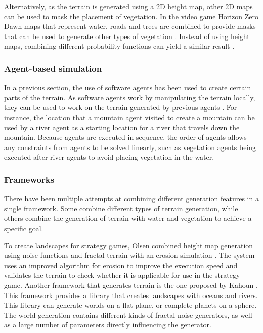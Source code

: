 \documentclass{article}
\begin{document}
Alternatively, as the terrain is generated using a 2D height map, other 2D maps can be used to mask the placement of vegetation. In the video game Horizon Zero Dawn maps that represent water, roads and trees are combined to provide masks that can be used to generate other types of vegetation \cite{van_muijden_gpu-based_2017}. Instead of using height maps, combining different probability functions can yield a similar result \cite{weier_generating_2013}.

\subsubsection{Agent-based simulation}
In a previous section, the use of software agents has been used to create certain parts of the terrain. As software agents work by manipulating the terrain locally, they can be used to work on the terrain generated by previous agents \cite{doran_controlled_2010}. For instance, the location that a mountain agent visited to create a mountain can be used by a river agent as a starting location for a river that travels down the mountain. Because agents are executed in sequence, the order of agents allows any constraints from agents to be solved linearly, such as vegetation agents being executed after river agents to avoid placing vegetation in the water.

\subsubsection{Frameworks}
There have been multiple attempts at combining different generation features in a single framework. Some combine different types of terrain generation, while others combine the generation of terrain with water and vegetation to achieve a specific goal.

To create landscapes for strategy games, Olsen combined height map generation using noise functions and fractal terrain with an erosion simulation \cite{olsen_realtime_2004}. The system uses an improved algorithm for erosion to improve the execution speed and validates the terrain to check whether it is applicable for use in the strategy game. Another framework that generates terrain is the one proposed by Kahoun \cite{kahoun_realtime_2013}. This framework provides a library that creates landscapes with oceans and rivers. This library can generate worlds on a flat plane, or complete planets on a sphere. The world generation contains different kinds of fractal noise generators, as well as a large number of parameters directly influencing the generator.
\end{document}
